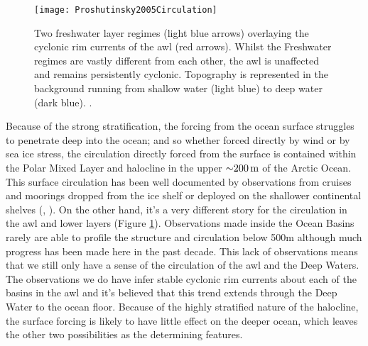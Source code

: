 \documentclass[10pt,a4paper]{article}
\begin{document}
\begin{figure}
	\centering
	\texttt{[image: Proshutinsky2005Circulation]}
	\caption[\cite{proshutinsky2005arctic}]{ Two freshwater layer regimes (light 
		blue arrows) overlaying the cyclonic rim currents of the \gls{awl} (red arrows).
		Whilst the Freshwater regimes are vastly different from each other, the
		\gls{awl} is unaffected and remains persistently cyclonic.
		Topography is represented in the background running from 
		shallow water (light blue) to deep water (dark blue).  \cite{proshutinsky2005arctic}.}
	\label{fig:Proshutinsky2005Circulation}
\end{figure}

Because of the strong stratification, the forcing from the ocean surface 
struggles to penetrate deep into the ocean; and so whether forced directly by wind 
or by sea ice stress, the circulation
directly forced from the surface is contained within the Polar Mixed Layer 
and halocline in the upper ${\sim}200\,{\rm m}$ of the Arctic Ocean. 
This surface circulation has been well documented by observations
from cruises and moorings  dropped  from  the  ice  shelf  or  deployed  on 
the  shallower  continental  shelves (\cite{gerdes1997large}, \cite{jones2001circulation}). On the other hand, it's a very different
story for the circulation in the \gls{awl} and lower layers (Figure \ref{fig:Proshutinsky2005Circulation}). Observations made
inside the Ocean Basins rarely are able to profile the structure  and
circulation  below 500m  although much progress has been made here in the
past decade. This lack of observations means that  we  still only have  a  sense  of  the circulation 
of the \gls{awl} and the Deep  Waters.  The  observations  we  do 
have  infer stable cyclonic  rim  currents about each of the basins in the
\gls{awl} and it's believed that this trend extends through the Deep Water to the 
ocean floor.  Because of the highly stratified nature of the halocline, the surface forcing 
is likely to have little effect on the deeper ocean, which leaves the other 
two possibilities as the determining features.
\end{document}
